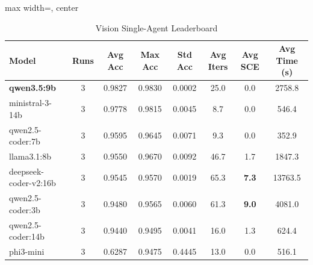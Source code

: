 \documentclass[11pt,a4paper]{article}
\begin{document}
\begin{table}[ht]
\centering
\footnotesize
\setlength{\tabcolsep}{3pt}
\caption{Vision Single-Agent Leaderboard}
\label{tab:vision_single}
\begin{adjustbox}{max width=\textwidth, center}
\begin{tabular}{>{\raggedright\arraybackslash}p{4.2cm}ccccccc}
\toprule
\textbf{Model} & \textbf{Runs} & \textbf{Avg Acc} & \textbf{Max Acc} & \textbf{Std Acc} & \textbf{Avg Iters} & \textbf{Avg SCE} & \textbf{Avg Time (s)} \\
\midrule
\textbf{qwen3.5:9b} & 3 & 0.9827 & 0.9830 & 0.0002 & 25.0 & 0.0 & 2758.8 \\
ministral-3-14b & 3 & 0.9778 & 0.9815 & 0.0045 & 8.7 & 0.0 & 546.4 \\
qwen2.5-coder:7b & 3 & 0.9595 & 0.9645 & 0.0071 & 9.3 & 0.0 & 352.9 \\
llama3.1:8b & 3 & 0.9550 & 0.9670 & 0.0092 & 46.7 & 1.7 & 1847.3 \\
deepseek-coder-v2:16b & 3 & 0.9545 & 0.9570 & 0.0019 & 65.3 & \textbf{7.3} & 13763.5 \\
qwen2.5-coder:3b & 3 & 0.9480 & 0.9565 & 0.0060 & 61.3 & \textbf{9.0} & 4081.0 \\
qwen2.5-coder:14b & 3 & 0.9440 & 0.9495 & 0.0041 & 16.0 & 1.3 & 624.4 \\
phi3-mini & 3 & 0.6287 & 0.9475 & 0.4445 & 13.0 & 0.0 & 516.1 \\
\bottomrule
\end{tabular}
\end{adjustbox}
\end{table}
\end{document}
